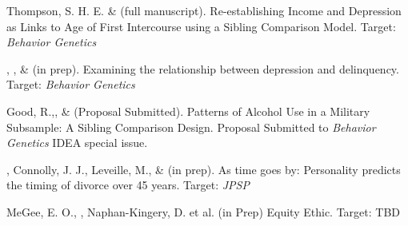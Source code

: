 \item Thompson, S. H. E. \noteA \& \meb (full manuscript). Re-establishing Income and Depression as Links to Age of First Intercourse using a Sibling Comparison Model. Target: \textit{Behavior Genetics}

\item \emsims, \jt, \& \meb (in prep). Examining the relationship between depression and delinquency. Target: \textit{Behavior Genetics}

\item Good, R.,\noteA \yrh, \&  \meb (Proposal Submitted). Patterns of Alcohol Use in a Military Subsample: A Sibling Comparison Design. Proposal Submitted to \textit{Behavior Genetics} IDEA special issue.
%
\item \meb, Connolly, J. J., Leveille, M., \& \jjj (in prep). As time goes by: Personality predicts the timing of divorce over 45 years. Target: \textit{JPSP}
%

\item MeGee, E. O., \meb, Naphan-Kingery, D. et al. (in Prep) Equity Ethic. Target: TBD











